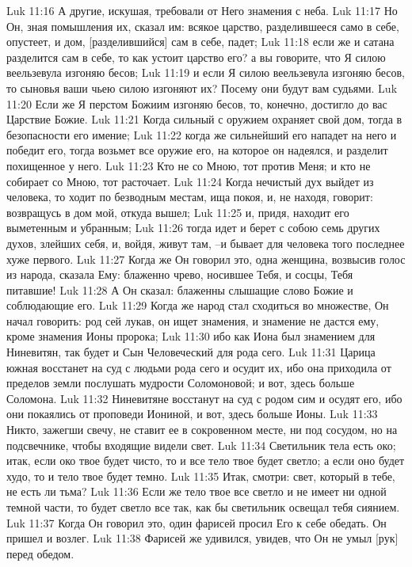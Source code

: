 Luk 11:16  А другие, искушая, требовали от Него знамения с неба.
Luk 11:17  Но Он, зная помышления их, сказал им: всякое царство, разделившееся само в себе, опустеет, и дом, [разделившийся] сам в себе, падет;
Luk 11:18  если же и сатана разделится сам в себе, то как устоит царство его? а вы говорите, что Я силою веельзевула изгоняю бесов;
Luk 11:19  и если Я силою веельзевула изгоняю бесов, то сыновья ваши чьею силою изгоняют их? Посему они будут вам судьями.
Luk 11:20  Если же Я перстом Божиим изгоняю бесов, то, конечно, достигло до вас Царствие Божие.
Luk 11:21  Когда сильный с оружием охраняет свой дом, тогда в безопасности его имение;
Luk 11:22  когда же сильнейший его нападет на него и победит его, тогда возьмет все оружие его, на которое он надеялся, и разделит похищенное у него.
Luk 11:23  Кто не со Мною, тот против Меня; и кто не собирает со Мною, тот расточает.
Luk 11:24  Когда нечистый дух выйдет из человека, то ходит по безводным местам, ища покоя, и, не находя, говорит: возвращусь в дом мой, откуда вышел;
Luk 11:25  и, придя, находит его выметенным и убранным;
Luk 11:26  тогда идет и берет с собою семь других духов, злейших себя, и, войдя, живут там, --и бывает для человека того последнее хуже первого.
Luk 11:27  Когда же Он говорил это, одна женщина, возвысив голос из народа, сказала Ему: блаженно чрево, носившее Тебя, и сосцы, Тебя питавшие!
Luk 11:28  А Он сказал: блаженны слышащие слово Божие и соблюдающие его.
Luk 11:29  Когда же народ стал сходиться во множестве, Он начал говорить: род сей лукав, он ищет знамения, и знамение не дастся ему, кроме знамения Ионы пророка;
Luk 11:30  ибо как Иона был знамением для Ниневитян, так будет и Сын Человеческий для рода сего.
Luk 11:31  Царица южная восстанет на суд с людьми рода сего и осудит их, ибо она приходила от пределов земли послушать мудрости Соломоновой; и вот, здесь больше Соломона.
Luk 11:32  Ниневитяне восстанут на суд с родом сим и осудят его, ибо они покаялись от проповеди Иониной, и вот, здесь больше Ионы.
Luk 11:33  Никто, зажегши свечу, не ставит ее в сокровенном месте, ни под сосудом, но на подсвечнике, чтобы входящие видели свет.
Luk 11:34  Светильник тела есть око; итак, если око твое будет чисто, то и все тело твое будет светло; а если оно будет худо, то и тело твое будет темно.
Luk 11:35  Итак, смотри: свет, который в тебе, не есть ли тьма?
Luk 11:36  Если же тело твое все светло и не имеет ни одной темной части, то будет светло все так, как бы светильник освещал тебя сиянием.
Luk 11:37  Когда Он говорил это, один фарисей просил Его к себе обедать. Он пришел и возлег.
Luk 11:38  Фарисей же удивился, увидев, что Он не умыл [рук] перед обедом.
